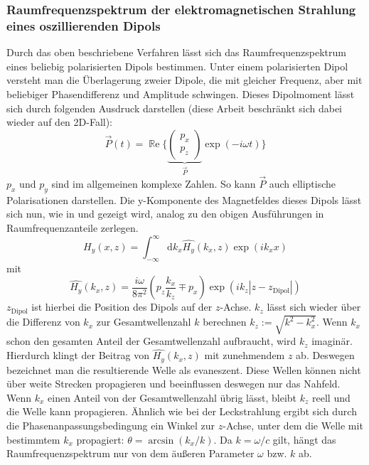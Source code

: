 \documentclass[titlepage,  ngerman]{article}
\renewcommand{\Re}{\operatorname{\mathbb{R}e}}
\begin{document}
	\subsubsection{Raumfrequenzspektrum der elektromagnetischen Strahlung eines oszillierenden Dipols}
	\label{sec:spatial_freq_dip}
	Durch das oben beschriebene Verfahren lässt sich das Raumfrequenzspektrum eines beliebig polarisierten Dipols bestimmen. Unter einem polarisierten Dipol versteht man die Überlagerung zweier Dipole, die mit gleicher Frequenz, aber mit beliebiger Phasendifferenz und Amplitude schwingen. Dieses Dipolmoment lässt sich durch folgenden Ausdruck darstellen (diese Arbeit beschränkt sich dabei wieder auf den 2D-Fall): 
	$$\vec{P}(t)= \Re\biggl\{\underbrace{\begin{pmatrix} p_x \\ p_z \end{pmatrix}}_{\vec{P}} \exp(-i\omega t)\biggr\} $$
	$p_x$ und $p_y$ sind im allgemeinen komplexe Zahlen. So kann $\vec{P}$ auch elliptische Polarisationen darstellen. Die y-Komponente des Magnetfeldes dieses Dipols lässt sich nun, wie in \cite{Novotny.2012b} und \cite{RodriguezFortuno.2013} gezeigt wird, analog zu den obigen Ausführungen in Raumfrequenzanteile zerlegen.
	\begin{equation}
		H_y(x, z) = \int_{-\infty}^{\infty}\mathrm{d}k_x\hat{H_y}(k_x, z)\exp(ik _xx) 
	\end{equation}
	mit
	\begin{equation}
		\label{eq:spatial_freq_dip}
		\boxed{\hat{H_y}(k_x, z) = \dfrac{i\omega}{8\pi^2}\left(p_z\dfrac{k_x}{k_z} \mp p_x\right)\exp(ik_z|z-z_{\mathrm{Dipol}}|)}
	\end{equation}
	$z_{\mathrm{Dipol}}$ ist hierbei die Position des Dipols auf der $z$-Achse. $k_z$ lässt sich wieder über die Differenz von $k_x$ zur Gesamtwellenzahl $k$ berechnen $k_z := \sqrt{k^2-k_x^2}$. Wenn $k_x$ schon den gesamten Anteil der Gesamtwellenzahl aufbraucht,  wird $k_z$ imaginär. Hierdurch klingt der Beitrag von $\hat{H_y}(k_x, z)$ mit zunehmendem $z$ ab. Deswegen bezeichnet man die resultierende Welle als evaneszent. Diese Wellen können nicht über weite Strecken propagieren und beeinflussen deswegen nur das Nahfeld. Wenn $k_x$ einen Anteil von der Gesamtwellenzahl übrig lässt, bleibt $k_z$ reell und die Welle kann propagieren. Ähnlich wie bei der Leckstrahlung ergibt sich durch die Phasenanpassungsbedingung ein Winkel zur $z$-Achse, unter dem die Welle mit bestimmtem $k_x$ propagiert: $\theta = \arcsin(k_x/k)$. Da $k = \omega / c$ gilt, hängt das Raumfrequenzspektrum nur von dem äußeren Parameter $\omega$ bzw. $k$ ab. 
\end{document}
